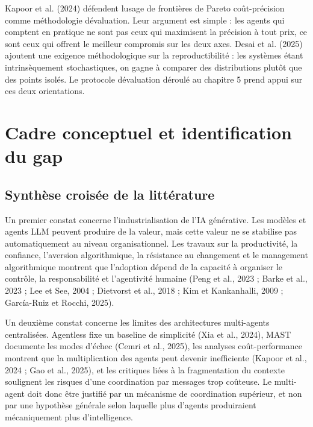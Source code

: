 Kapoor et al. (2024) défendent l\textquotesingle usage de frontières
de Pareto coût-précision comme méthodologie d\textquotesingle évaluation.
Leur argument est simple : les agents qui comptent en pratique ne sont
pas ceux qui maximisent la précision à tout prix, ce sont ceux qui
offrent le meilleur compromis sur les deux axes. Desai et al. (2025)
ajoutent une exigence méthodologique sur la reproductibilité : les
systèmes étant intrinsèquement stochastiques, on gagne à comparer des
distributions plutôt que des points isolés. Le protocole
d\textquotesingle évaluation déroulé au chapitre 5 prend appui sur ces
deux orientations.

\section{Cadre conceptuel et identification du gap}\label{sec:rev-gap}

\subsection{Synthèse croisée de la littérature}\label{synthuxe8se-croisuxe9e-de-la-littuxe9rature}

Un premier constat concerne l'industrialisation de l'IA générative. Les modèles et agents LLM peuvent produire de la valeur, mais cette valeur ne se stabilise pas automatiquement au niveau organisationnel. Les travaux sur la productivité, la confiance, l'aversion algorithmique, la résistance au changement et le management algorithmique montrent que l'adoption dépend de la capacité à organiser le contrôle, la responsabilité et l'agentivité humaine (Peng et al., 2023 ; Barke et al., 2023 ; Lee et See, 2004 ; Dietvorst et al., 2018 ; Kim et Kankanhalli, 2009 ; García-Ruiz et Rocchi, 2025).

Un deuxième constat concerne les limites des architectures multi-agents centralisées. Agentless fixe un baseline de simplicité (Xia et al., 2024), MAST documente les modes d'échec (Cemri et al., 2025), les analyses coût-performance montrent que la multiplication des agents peut devenir inefficiente (Kapoor et al., 2024 ; Gao et al., 2025), et les critiques liées à la fragmentation du contexte soulignent les risques d'une coordination par messages trop coûteuse. Le multi-agent doit donc être justifié par un mécanisme de coordination supérieur, et non par une hypothèse générale selon laquelle plus d'agents produiraient mécaniquement plus d'intelligence.

